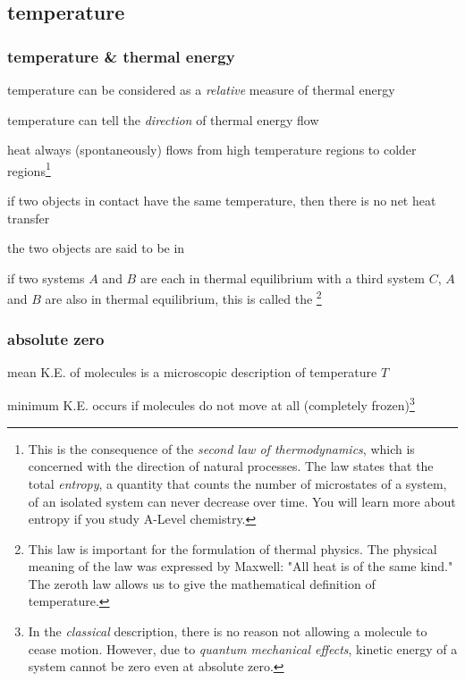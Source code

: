 \subsection{temperature}

\subsubsection{temperature \& thermal energy}

\cmt temperature can be considered as a \emph{relative} measure of thermal energy

temperature can tell the \emph{direction} of thermal energy flow

heat always (spontaneously) flows from high temperature regions to colder regions\footnote{This is the consequence of the \emph{second law of thermodynamics}, which is concerned with the direction of natural processes. The law states that the total \emph{entropy}, a quantity that counts the number of microstates of a system, of an isolated system can never decrease over time. You will learn more about entropy if you study A-Level chemistry.}

\cmt if two objects in contact have the same temperature, then there is no net heat transfer

the two objects are said to be in 

\cmt if two systems $A$ and $B$ are each in thermal equilibrium with a third system $C$, $A$ and $B$ are also in thermal equilibrium, this is called the 
\footnote{This law is important for the formulation of thermal physics. The physical meaning of the law was expressed by Maxwell: "All heat is of the same kind." The zeroth law allows us to give the mathematical definition of temperature.}


\subsubsection{absolute zero}\label{s-abs-zero}

mean K.E. of molecules is a microscopic description of temperature $T$

minimum K.E. occurs if molecules do not move at all (completely frozen)\footnote{In the \emph{classical} description, there is no reason not allowing a molecule to cease motion. However, due to \emph{quantum mechanical effects}, kinetic energy of a system cannot be zero even at absolute zero.}

